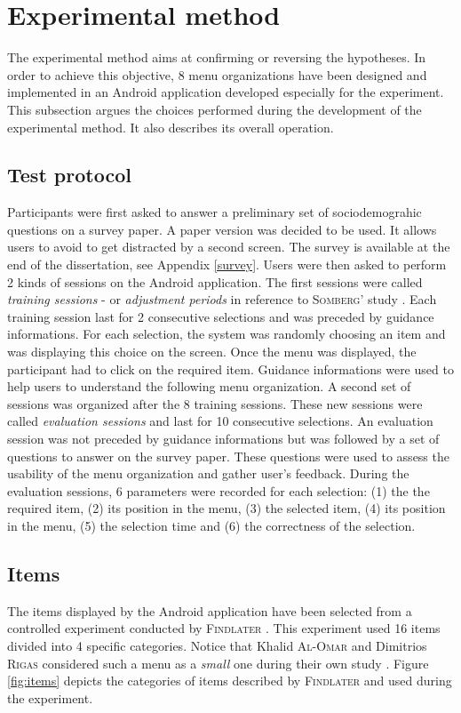 \section{Experimental method}
The experimental method aims at confirming or reversing the hypotheses. In 
order to achieve this objective, 8 menu organizations have been designed and 
implemented in an Android application developed especially for the 
experiment. This subsection argues the choices performed during the development 
of the experimental method. It also describes its overall operation.

\subsection{Test protocol} \label{test_protocol}
Participants were first asked to answer a preliminary set of sociodemograhic 
questions on a survey paper. A paper version was decided to be used. It allows 
users to avoid to get distracted by a second screen. The survey is available at 
the end of the 
dissertation, see Appendix \ref{survey}. Users were then asked to perform 2 
kinds of sessions on the Android application. The first sessions were called 
\textit{training sessions} - or \textit{adjustment periods} in reference to 
\textsc{Somberg}' study \cite{somberg}. Each training session last for 2 
consecutive 
selections and was preceded by guidance informations. For each selection, the 
system was randomly choosing an item and was displaying this choice on the 
screen. Once the menu was displayed, the participant had to click on the 
required item. Guidance informations were used to help users to understand the 
following menu organization. A second set of sessions was organized after the 8 
training sessions. These new sessions were called \textit{evaluation sessions} 
and last for 10 consecutive selections. An evaluation session was not preceded 
by guidance informations but was followed by a set of questions to answer on 
the survey paper. These questions were used to assess the usability of the menu 
organization and gather user's feedback. During the evaluation sessions, 6 
parameters were recorded for each selection: (1) the the required item, (2) 
its 
position in the menu, (3) the selected item, (4) its position in the menu, (5) 
the selection time and (6) the correctness of the selection.

\subsection{Items}
The items displayed by the Android application have been selected from a 
controlled experiment conducted by \textsc{Findlater} \cite{findlater}. This 
experiment 
used 16 items divided into 4 specific categories. Notice that Khalid 
\textsc{Al-Omar} and 
Dimitrios \textsc{Rigas} considered such a menu as a \textit{small} one during 
their own 
study \cite{alomar1}. Figure \ref{fig:items} depicts the categories of items 
described by \textsc{Findlater} and used during the experiment.\newline

